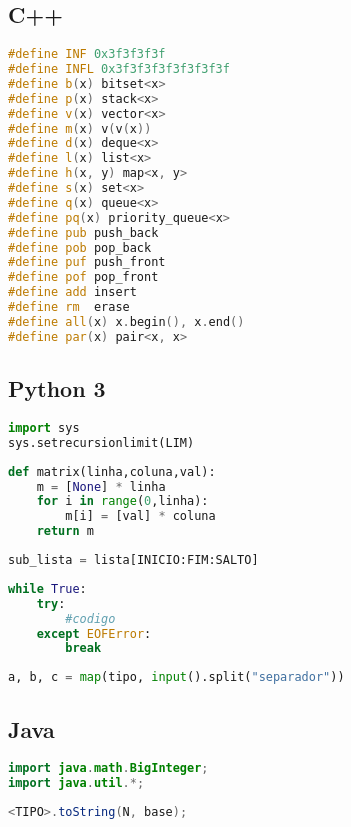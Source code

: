 \subsection*{C++}
\begin{lstlisting}[language=C++]
#define INF 0x3f3f3f3f
#define INFL 0x3f3f3f3f3f3f3f3f
#define b(x) bitset<x>
#define p(x) stack<x>
#define v(x) vector<x>
#define m(x) v(v(x))
#define d(x) deque<x>
#define l(x) list<x>
#define h(x, y) map<x, y>
#define s(x) set<x>
#define q(x) queue<x>
#define pq(x) priority_queue<x>
#define pub push_back
#define pob pop_back
#define puf push_front
#define pof pop_front
#define add insert
#define rm  erase
#define all(x) x.begin(), x.end()
#define par(x) pair<x, x>
\end{lstlisting}

\newpage

\subsection*{Python 3}
\begin{lstlisting}[language=Python, title={Tamanho da Pilha de Recursão}]
import sys
sys.setrecursionlimit(LIM)
\end{lstlisting}

\begin{lstlisting}[language=Python, title={Matriz}]
def matrix(linha,coluna,val):
	m = [None] * linha
	for i in range(0,linha):
		m[i] = [val] * coluna
	return m
\end{lstlisting}

\begin{lstlisting}[language=Python, title={Cortar Lista ou String }] 
sub_lista = lista[INICIO:FIM:SALTO]
\end{lstlisting}

\begin{lstlisting}[language=Python, title={Ler Até EOF}]
while True:
	try:
    	#codigo
    except EOFError:
    	break
\end{lstlisting}
\begin{lstlisting}[language=Python, title={Múltiplas Entradas na Mesma Linha}]
a, b, c = map(tipo, input().split("separador"))
\end{lstlisting}

\subsection*{Java}
\begin{lstlisting}[language=Java, title={Bibliotecas importantes}]
import java.math.BigInteger;
import java.util.*;
\end{lstlisting}

\begin{lstlisting}[language=Java, title={Conversão de Base}]
<TIPO>.toString(N, base);
\end{lstlisting}